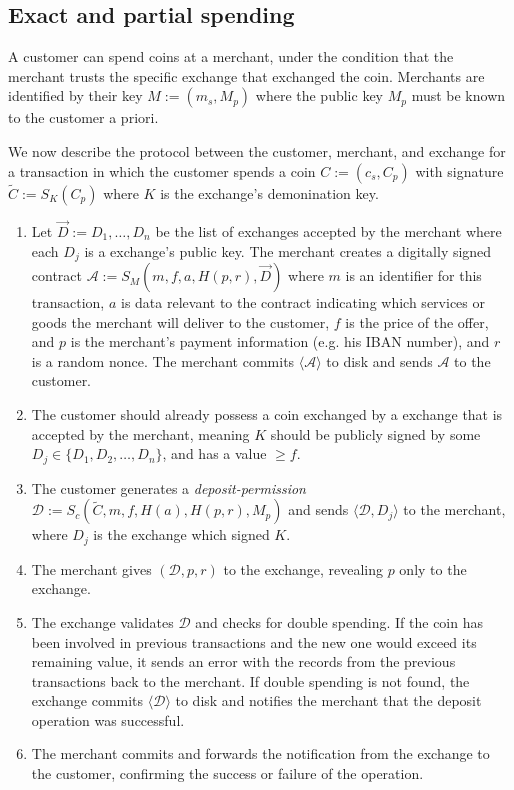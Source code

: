 \documentclass{llncs}
\begin{document}
\subsection{Exact and partial spending}

A customer can spend coins at a merchant, under the condition that the
merchant trusts the specific exchange that exchanged the coin.  Merchants are
identified by their key $M := (m_s, M_p)$ where the public key $M_p$
must be known to the customer a priori.

We now describe the protocol between the customer, merchant, and exchange
for a transaction in which the customer spends a coin $C := (c_s, C_p)$
with signature $\widetilde{C} := S_K(C_p)$
 where $K$ is the exchange's demonination key.

\begin{enumerate}
\item\label{contract}
  Let $\vec{D} := D_1, \ldots, D_n$ be the list of exchanges accepted by
  the merchant where each $D_j$ is a exchange's public key.
  The merchant creates a digitally signed contract
    $\mathcal{A} := S_M(m, f, a, H(p, r), \vec{D})$
  where $m$ is an identifier for this transaction, $a$ is data relevant
  to the contract indicating which services or goods the merchant will
  deliver to the customer, $f$ is the price of the offer, and
  $p$ is the merchant's payment information (e.g. his IBAN number), and
  $r$ is a random nonce.  The merchant commits $\langle \mathcal{A} \rangle$
  to disk and sends $\mathcal{A}$ to the customer.
\item\label{deposit}
  The customer should already possess a coin exchanged by a exchange that is
  accepted by the merchant, meaning $K$ should be publicly signed by
  some $D_j \in \{D_1, D_2, \ldots, D_n\}$, and has a value $\geq f$.
\item  The customer generates a \emph{deposit-permission} $\mathcal{D} :=
  S_c(\widetilde{C}, m, f, H(a), H(p,r), M_p)$
  and sends $\langle \mathcal{D}, D_j\rangle$ to the merchant,
  where $D_j$ is the exchange which signed $K$.
\item The merchant gives $(\mathcal{D}, p, r)$ to the exchange, revealing $p$
  only to the exchange.
\item The exchange validates $\mathcal{D}$ and checks for double spending.
  If the coin has been involved in previous transactions and the new
  one would exceed its remaining value, it sends an error
  with the records from the previous transactions back to the merchant.
%
  If double spending is not found, the exchange commits $\langle \mathcal{D} \rangle$ to disk
  and notifies the merchant that the deposit operation was successful.
\item The merchant commits and forwards the notification from the exchange to the
  customer, confirming the success or failure of the operation.
\end{enumerate}
\end{document}
